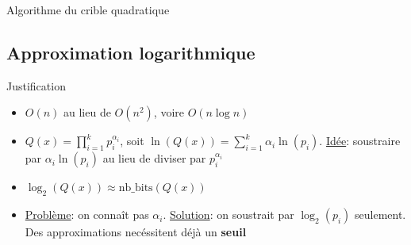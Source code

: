 \documentclass{beamer}
\begin{document}
\begin{frame}
\begin{algorithm}[H]
    \caption{Algorithme du crible quadratique}
    \small
    \begin{algorithmic}[1]

                    \EndWhile
                \EndWhile
            \EndFor
        \EndFor
    \end{algorithmic}
    \end{algorithm}
\end{frame}

\subsection{Approximation logarithmique}

\begin{frame}{Justification}
    \begin{itemize}[<+->]
        \item $O(n)$ au lieu de $O(n^2)$, voire $O(n\log n)$
        \item $Q(x) = \prod_{i=1}^k p_i^{\alpha_i}$, soit $\ln(Q(x)) = \sum_{i=1}^k \alpha_i \ln(p_i)$.
        \newline \underline{Idée}: soustraire par $\alpha_i \ln(p_i)$ au lieu de diviser par $p_i^{\alpha_i}$
        \item $\log_2(Q(x)) \approx \text{nb\_bits}(Q(x))$
        \item \underline{Problème}: on connaît pas $\alpha_i$. 
        \newline \underline{Solution}: on soustrait par $\log_2(p_i)$ seulement. Des approximations necéssitent déjà un \textbf{seuil}
    \end{itemize}
\end{frame}
\end{document}
